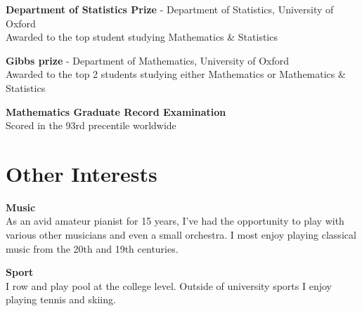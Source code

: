 \documentclass[12pt,a4paper,sans]{moderncv}
\begin{document}
\textbf{Department of Statistics Prize } - Department of Statistics, University of Oxford \\
{Awarded to the top student studying Mathematics \& Statistics}

\vspace{3mm}

\textbf{Gibbs prize} - Department of Mathematics, University of Oxford \\
{Awarded to the top 2 students studying either Mathematics or Mathematics \& Statistics}

\vspace{3mm}

\textbf{Mathematics Graduate Record Examination} \\ 
{Scored in the 93rd precentile worldwide}

\vspace{-3mm}

\section{Other Interests}

\textbf{Music} \\
{As an avid amateur pianist for 15 years, I've had the opportunity to play with various other musicians and even a small orchestra. I most enjoy playing classical music from the 20th and 19th centuries. }

\vspace{3mm}

\textbf{Sport} \\
{I row and play pool at the college level. Outside of university sports I enjoy playing tennis and skiing. }
\end{document}
